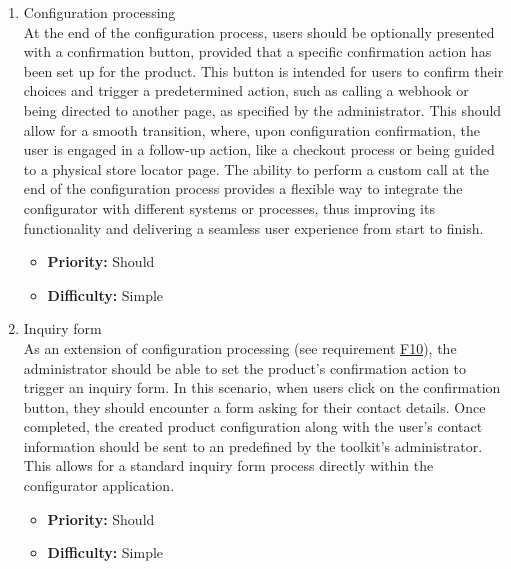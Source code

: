 \begin{enumerate}[label=\textbf{F\arabic*:}, leftmargin=*]
\item \label{itm:F10} Configuration processing
\vspace{2pt}
\\At the end of the configuration process, users should be optionally presented with a confirmation button, provided that a specific confirmation action has been set up for the product. This button is intended for users to confirm their choices and trigger a predetermined action, such as calling a webhook or being directed to another page, as specified by the administrator. This should allow for a smooth transition, where, upon configuration confirmation, the user is engaged in a follow-up action, like a checkout process or being guided to a physical store locator page. The ability to perform a custom  call at the end of the configuration process provides a flexible way to integrate the configurator with different systems or processes, thus improving its functionality and delivering a seamless user experience from start to finish.
\begin{itemize}[noitemsep, label=\trianglebullet]
    \item \textbf{Priority:} Should
    \item \textbf{Difficulty:} Simple
\end{itemize}
\vspace{4pt}

\item \label{itm:F11} Inquiry form
\vspace{2pt}
\\As an extension of configuration processing (see requirement \hyperref[itm:F10]{F10}), the administrator should be able to set the product's confirmation action to trigger an inquiry form. In this scenario, when users click on the confirmation button, they should encounter a form asking for their contact details. Once completed, the created product configuration along with the user's contact information should be sent to an  predefined by the toolkit's administrator. This allows for a standard inquiry form process directly within the configurator application.
\begin{itemize}[noitemsep, label=\trianglebullet]
    \item \textbf{Priority:} Should
    \item \textbf{Difficulty:} Simple
\end{itemize}
\vspace{4pt}


\end{enumerate}
